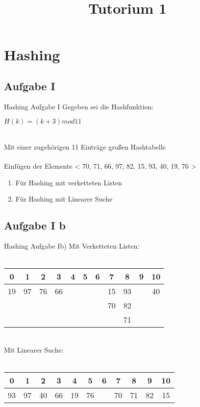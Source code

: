 
\title[Algorithmen I SS 14]{Tutorium 1}


\section{Hashing}
	\subsection{Aufgabe I}
	\begin{frame}{Hashing Aufgabe I}
		Gegeben sei die Hashfunktion: \\
		\begin{center}
			$ H(k) = (k+3) mod 11$ 
		\end{center}
		\ \\
		Mit einer zugehörigen 11 Einträge großen Hashtabelle \\
		\ \\
		Einfügen der Elemente < 70, 71, 66, 97, 82, 15, 93, 40, 19, 76 >
		\\
		\begin{enumerate}
			\item Für Hashing mit verketteten Listen
			\item Für Hashing mit Linearer Suche
		\end{enumerate}

	\end{frame}

	\subsection{Aufgabe I b}	
	\begin{frame}{Hashing Aufgabe Ib)}
		Mit Verketteten Listen:
		\ \\
		\ \\
		\begin{tabular*}{0.75\textwidth}{  c | c | c | c | c | c | c | c | c | c | c  }
			0 & 1 & 2 & 3 & 4 & 5 & 6 & 7 & 8 & 9 & 10 \\
			\hline
			19 & 97 & 76 & 66 &  &  &  & 15 & 93 &  & 40 \\
			  &  &  &  &  &  &  & 70 & 82 &  &  \\
			  &  &  &  &  &  &  &  & 71 &  &  \\
			
		\end{tabular*}
		\ \\
		\parskip 16pt
		Mit Linearer Suche:
		\ \\
		\ \\
		\begin{tabular*}{0.75\textwidth}{  c | c | c | c | c | c | c | c | c | c | c  }
			0 & 1 & 2 & 3 & 4 & 5 & 6 & 7 & 8 & 9 & 10 \\
			\hline
			93 & 97 & 40 & 66 & 19 & 76 &  & 70 & 71 & 82 & 15 \\			
		\end{tabular*}

		
	\end{frame}


